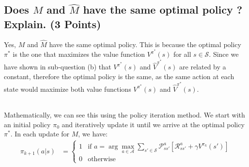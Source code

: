 \documentclass{article}
\renewcommand{\S}{\mathcal{S}}
\newcommand{\A}{\mathcal{A}}
\renewcommand{\P}{\mathcal{P}}
\newcommand{\R}{\mathcal{R}}
\newcommand{\Rhat}{\hat{\mathcal{R}}}
\begin{document}

\subsection{Does $M$ and $\hat{M}$ have the same optimal policy ? Explain. (3 Points)}

Yes, $M$ and $\hat{M}$ have the same optimal policy. This is because the optimal policy $\pi^*$ is the one that maximizes the value function $V^{\pi^*}(s)$ for all $s \in \S$. Since we have shown in sub-question (b) that $V^{\pi^*}(s)$ and $\hat{V}^{\pi^*}(s)$ are related by a constant, therefore the optimal policy is the same, as the same action at each state would maximize both value functions $V^{\pi^*}(s)$ and $\hat{V}^{\pi^*}(s)$.

\, \\
\noindent
Mathematically, we can see this using the policy iteration method. We start with an initial policy $\pi_0$ and iteratively update it until we arrive at the optimal policy $\pi^*$. In each update for $M$, we have:
\begin{align}
	\pi_{k+1}(a|s) &= \begin{cases}
		1 & \text{if } a = \arg\max_{a \in \A} \sum_{s' \in \S} \P^a_{ss'} \left[ \R^a_{ss'} + \gamma V^{\pi_k}(s') \right] \\
		0 & \text{otherwise}
	\end{cases}
\end{align}
\end{document}
